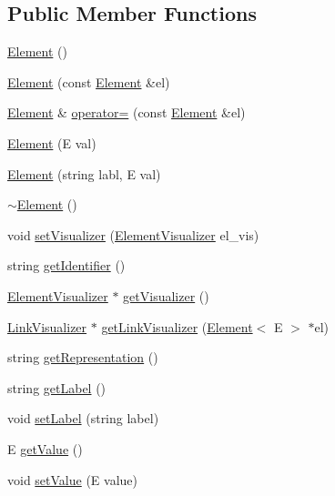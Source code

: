 \subsection*{Public Member Functions}
\begin{DoxyCompactItemize}
\item 
\hyperlink{classbridges_1_1_element_ae5eca68c417b51977f258ac6a3d1e9bc}{Element} ()
\item 
\hyperlink{classbridges_1_1_element_af351d4925aa7b5d57effbadd44bb415c}{Element} (const \hyperlink{classbridges_1_1_element}{Element} \&el)
\item 
\hyperlink{classbridges_1_1_element}{Element} \& \hyperlink{classbridges_1_1_element_a5fccf2fed3ae841aff1f8d8bff0bd11b}{operator=} (const \hyperlink{classbridges_1_1_element}{Element} \&el)
\item 
\hyperlink{classbridges_1_1_element_aa4ad8f18cd7d041a8f07701cdb7dfa1a}{Element} (E val)
\item 
\hyperlink{classbridges_1_1_element_a5878b7cb3b9e4abfe9f8d63b22936365}{Element} (string labl, E val)
\item 
\hyperlink{classbridges_1_1_element_a7120a675b75bf30fcbe88c3b6d0a2e30}{$\sim$\+Element} ()
\item 
void \hyperlink{classbridges_1_1_element_a44b88a2d97a96aa6c443334046f425a7}{set\+Visualizer} (\hyperlink{classbridges_1_1_element_visualizer}{Element\+Visualizer} el\+\_\+vis)
\item 
string \hyperlink{classbridges_1_1_element_a2a26b9cd7de3a865f1d95dcc598b5ae3}{get\+Identifier} ()
\item 
\hyperlink{classbridges_1_1_element_visualizer}{Element\+Visualizer} $\ast$ \hyperlink{classbridges_1_1_element_a358f350ae6e33d55c4ac9f9213d0c5bc}{get\+Visualizer} ()
\item 
\hyperlink{classbridges_1_1_link_visualizer}{Link\+Visualizer} $\ast$ \hyperlink{classbridges_1_1_element_a28a5d72ff03d6a66726a2c93ad2a9632}{get\+Link\+Visualizer} (\hyperlink{classbridges_1_1_element}{Element}$<$ E $>$ $\ast$el)
\item 
string \hyperlink{classbridges_1_1_element_a0648a2983f9740f2beec136f9d3a7008}{get\+Representation} ()
\item 
string \hyperlink{classbridges_1_1_element_a506d0f16ebe84cf1351e9d8726b57c14}{get\+Label} ()
\item 
void \hyperlink{classbridges_1_1_element_a49c80a5aa20b0feb6d4f551ac206b51c}{set\+Label} (string label)
\item 
E \hyperlink{classbridges_1_1_element_a9b11b247ebb6ea584a9df414d47a9abc}{get\+Value} ()
\item 
void \hyperlink{classbridges_1_1_element_a54de77e83f615a3c27b46090ea4ba2fb}{set\+Value} (E value)
\end{DoxyCompactItemize}


